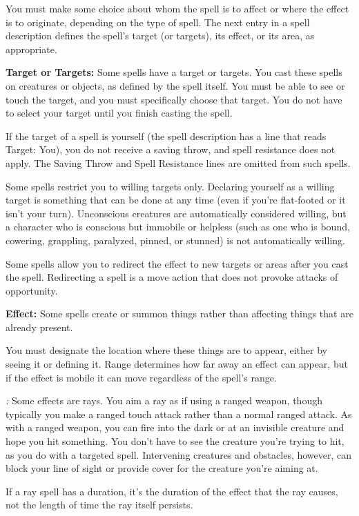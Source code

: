 You must make some choice about whom the spell is to affect or where the effect 
is to originate, depending on the type of spell. The next entry in a spell description 
defines the spell's target (or targets), its effect, or its area, as appropriate.

\textbf{Target or Targets:} Some spells have a target or targets. You 
cast these spells on creatures or objects, as defined by the spell itself. You 
must be able to see or touch the target, and you must specifically choose that 
target. You do not have to select your target until you finish casting the spell.

If the target of a spell is yourself (the spell description has a line that reads 
Target: You), you do not receive a saving throw, and spell resistance does not 
apply. The Saving Throw and Spell Resistance lines are omitted from such spells.

Some spells restrict you to willing targets only. Declaring yourself as a willing 
target is something that can be done at any time (even if you're flat-footed or 
it isn't your turn). Unconscious creatures are automatically considered willing, 
but a character who is conscious but immobile or helpless (such as one who is bound, 
cowering, grappling, paralyzed, pinned, or stunned) is not automatically willing.

Some spells allow you to redirect the effect to new targets or areas after you 
cast the spell. Redirecting a spell is a move action that does not provoke attacks 
of opportunity.

\textbf{Effect:} Some spells create or summon things rather than affecting things 
that are already present.

You must designate the location where these things are to appear, either by seeing 
it or defining it. Range determines how far away an effect can appear, but if the 
effect is mobile it can move regardless of the spell's range.

\textit{:} Some effects are rays. You aim a ray as if using a ranged weapon, 
though typically you make a ranged touch attack rather than a normal ranged attack. 
As with a ranged weapon, you can fire into the dark or at an invisible creature 
and hope you hit something. You don't have to see the creature you're trying to 
hit, as you do with a targeted spell. Intervening creatures and obstacles, however, 
can block your line of sight or provide cover for the creature you're aiming at.

If a ray spell has a duration, it's the duration of the effect that the ray causes, 
not the length of time the ray itself persists.


